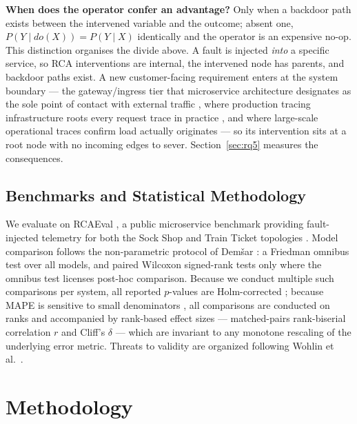 \documentclass[journal, 10pt]{IEEEtran}
\begin{document}
\textbf{When does the operator confer an advantage?} Only when a backdoor path
exists between the intervened variable and the outcome; absent one,
$P(Y \mid do(X)) = P(Y \mid X)$ identically and the operator is an expensive
no-op. This distinction organises the divide above. A fault is injected
\emph{into} a specific service, so RCA interventions are internal, the intervened
node has parents, and backdoor paths exist. A new customer-facing requirement
enters at the system boundary --- the gateway/ingress tier that microservice
architecture designates as the sole point of contact with external
traffic \cite{richardson2018microservices}, where production tracing
infrastructure roots every request trace in practice
\cite{sigelman2010dapper}, and where large-scale operational traces confirm
load actually originates \cite{luo2021characterizing} --- so its intervention
sits at a root node with no incoming edges to sever. Section~\ref{sec:rq5}
measures the consequences.


\subsection{Benchmarks and Statistical Methodology}
We evaluate on RCAEval \cite{pham2024rcaeval}, a public microservice benchmark providing fault-injected telemetry for both the Sock Shop and Train Ticket topologies \cite{gan2019deathstarbench}. Model comparison follows the non-parametric protocol of Demšar \cite{demsar2006}: a Friedman omnibus test over all models, and paired Wilcoxon signed-rank tests only where the omnibus test licenses post-hoc comparison. Because we conduct multiple such comparisons per system, all reported $p$-values are Holm-corrected \cite{holm1979}; because MAPE is sensitive to small denominators \cite{hyndman2006accuracy}, all comparisons are conducted on ranks and accompanied by rank-based effect sizes --- matched-pairs rank-biserial correlation $r$ and Cliff's $\delta$ \cite{cliff1993dominance} --- which are invariant to any monotone rescaling of the underlying error metric. Threats to validity are organized following Wohlin et al.\ \cite{wohlin2012experimentation}.

\section{Methodology}
\label{sec:methodology}
\end{document}
